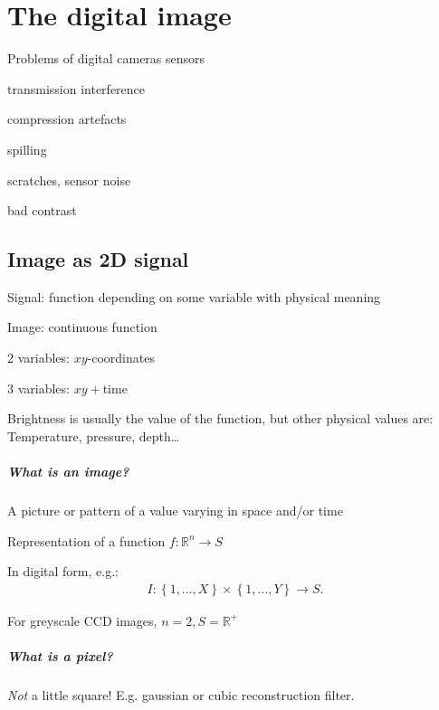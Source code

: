 \chapter{The digital image}
Problems of digital cameras sensors
\begin{compactitem}
	\item transmission interference
	\item compression artefacts
	\item spilling
	\item scratches, sensor noise
	\item bad contrast
\end{compactitem}
\section{Image as 2D signal}
\begin{compactdesc}
	\item[Signal:] function depending on some variable with physical meaning
	\item[Image: ] continuous function
		\begin{compactdesc}
			\item[2 variables:] $xy$-coordinates
			\item[3 variables:] $xy+$time
		\end{compactdesc}
\end{compactdesc}
Brightness is usually the value of the function, but other physical values are: Temperature, pressure, depth\ldots
\paragraph{What is an image?}
\begin{compactitem}
	\item A picture or pattern of a value varying in space and/or time
	\item Representation of a function $f:\mathbb{R}^n\to S$
\item In digital form, e.g.: \begin{gather*}
			I:\left\{ 1,\ldots,X \right\}\times\left\{ 1,\ldots,Y \right\}\to S.
		\end{gather*}
	\item For greyscale CCD images, $n=2, S=\mathbb{R}^+$
\end{compactitem}
\paragraph{What is a pixel?}
\emph{Not} a little square! E.g. gaussian or cubic reconstruction filter.
